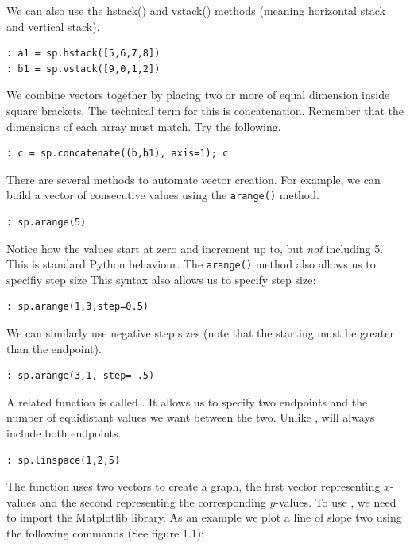 We can also use the hstack() and vstack() methods (meaning horizontal stack and
vertical stack).
\begin{lstlisting}
: a1 = sp.hstack([5,6,7,8])
: b1 = sp.vstack([9,0,1,2])
\end{lstlisting}

We combine vectors together by placing two or more of equal dimension inside
square brackets. The technical term for this is concatenation.  Remember that
the dimensions of each array must match.  Try the following.
\begin{lstlisting}
: c = sp.concatenate((b,b1), axis=1); c
\end{lstlisting}

There are several methods to automate vector creation. For example, we can build
a vector of consecutive values using the \texttt{arange()} method.

\begin{lstlisting}
: sp.arange(5)
\end{lstlisting}

Notice how the values start at zero and increment up to, but \emph{not}
including 5.  This is standard Python behaviour.  The \texttt{arange()} method
also allows us to specifiy step size
This syntax also allows us to specify step size:

\begin{lstlisting}
: sp.arange(1,3,step=0.5)
\end{lstlisting}

We can similarly use negative step sizes (note that the starting must be greater
than the endpoint).

\begin{lstlisting}
: sp.arange(3,1, step=-.5)
\end{lstlisting}

A related function is called . It allows us to specify two
endpoints and the number of equidistant values we want between the two.  Unlike
,  will always include both endpoints.

\begin{lstlisting}
: sp.linspace(1,2,5)
\end{lstlisting}

The  function uses two vectors to create a graph, the first vector
representing $x$-values and the second representing the corresponding
$y$-values.  To use , we need to import the Matplotlib library.  As
an example we plot a line of slope two using the following commands (See figure
1.1):

